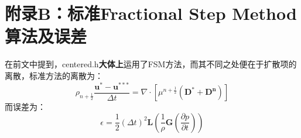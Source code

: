 \documentclass[lang=cn,11pt,a4paper]{elegantpaper}
\begin{document}
\section{附录B：标准Fractional Step Method算法及误差}
在前文中提到，centered.h\textbf{大体上}运用了FSM方法，而其不同之处便在于扩散项的离散，标准方法的离散为：
 \begin{equation}\label{equ:fsm}
    \rho_{n+\frac{1}{2}}\frac{\mathbf{u}^* - \mathbf{u}^{***}}{\Delta t}= \nabla \cdot [\mu^{n+\frac{1}{2}}(\mathbf{D^*}+\mathbf{D^{n}})]
\end{equation}
而误差为：
\begin{equation}
    \epsilon = \frac{1}{2}(\Delta t)^2\mathbf{L}(\frac{1}{\rho}\mathbf{G}(\frac{\partial p}{\partial t}))
\end{equation}
\printbibliography[heading=bibintoc, title=\ebibname]
\end{document}
